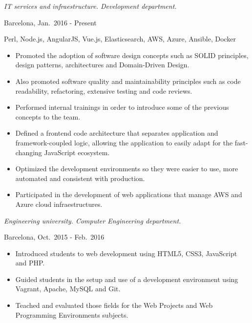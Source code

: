 \begin{description}[itemsep=15pt]

    \item[Software Engineer, \href{http://capside.com}{CAPSiDE}] \hfill

        \emph{IT services and infraestructure. Development department.}

        Barcelona, Jan.\ 2016 - Present

        Perl, Node.js, AngularJS, Vue.js, Elasticsearch, AWS, Azure, Ansible, Docker

        \begin{itemize}[itemsep=0pt]
            \item Promoted the adoption of software design concepts such as SOLID principles, design patterns, architectures and Domain-Driven Design.
            \item Also promoted software quality and maintainability principles such as code readability, refactoring, extensive testing and code reviews.
            \item Performed internal trainings in order to introduce some of the previous concepts to the team.
            \item Defined a frontend code architecture that separates application and framework-coupled logic, allowing the application to easily adapt for the fast-changing JavaScript ecosystem.
            \item Optimized the development environments so they were easier to use, more automated and consistent with production.
            \item Participated in the development of web applications that manage AWS and Azure cloud infraestructures.
        \end{itemize}
\newpage

    \item[Adjunct Lecturer in Web Projects, \href{http://www.salleurl.edu}{La Salle Campus}] \hfill

        \emph{Engineering university. Computer Engineering department.}

        Barcelona, Oct.\ 2015 - Feb.\ 2016

        \begin{itemize}[itemsep=0pt]
            \item Introduced students to web development using HTML5, CSS3, JavaScript and PHP.
            \item Guided students in the setup and use of a development environment using Vagrant, Apache, MySQL and Git.
            \item Teached and evaluated those fields for the Web Projects and Web Programming Environments subjects.
        \end{itemize}


\end{description}
